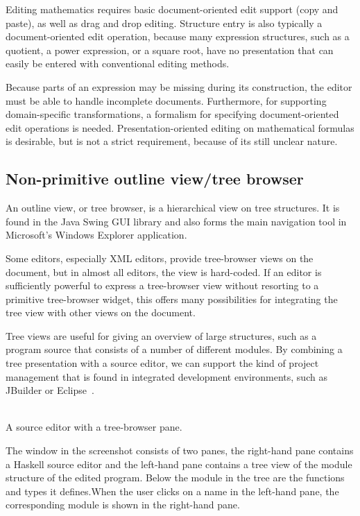 \documentclass{speauth}
\begin{document}
Editing mathematics requires basic document-oriented edit support (copy and paste), as well as drag and drop editing. Structure entry is also typically a document-oriented edit operation, because many expression structures, such as a quotient, a power expression, or a square root, have no presentation that can easily be entered with conventional editing methods.

Because parts of an expression may be missing during its construction,  the editor must be able to handle incomplete documents. Furthermore, for supporting domain-specific transformations, a formalism for specifying document-oriented edit operations is needed. Presentation-oriented editing on mathematical formulas is desirable, but is not a strict requirement, because of its still unclear nature.

\subsection{Non-primitive outline view/tree browser}\label{sect:treeBrowser}

An outline view, or tree browser, is a hierarchical view on tree structures. It is found in the Java Swing GUI library and also forms the main navigation tool in Microsoft's Windows Explorer application. 

Some editors, especially XML editors, provide tree-browser views on the document, but in almost all editors, the view is hard-coded. If an editor is sufficiently powerful to express a tree-browser view without resorting to a primitive tree-browser widget, this offers many possibilities for integrating the tree view with other views on the document. 

Tree views are useful for giving an overview of large structures, such as a program source that consists of a number of different modules. By combining a tree presentation with a source editor, we can support the kind of project management that is found in integrated development environments, such as JBuilder or Eclipse~\cite{eclipse2001}. 

\begin{center}
\\ [3mm]
{\normalsize \sf  A source editor with a tree-browser pane.}
\end{center}

The window in the screenshot consists of two panes, the right-hand pane contains a Haskell source editor and the left-hand pane contains a tree view of the module structure of the edited program. \bc Below the module in the tree are the functions and types it defines.\ec When the user clicks on a name in the left-hand pane, the corresponding module is shown in the right-hand pane.
\end{document}
